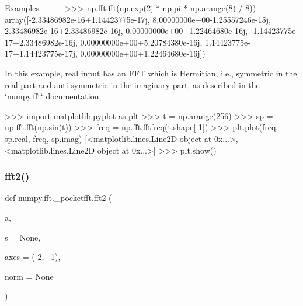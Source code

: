 \begin{DoxyVerb}
Examples
--------
>>> np.fft.fft(np.exp(2j * np.pi * np.arange(8) / 8))
array([-2.33486982e-16+1.14423775e-17j,  8.00000000e+00-1.25557246e-15j,
        2.33486982e-16+2.33486982e-16j,  0.00000000e+00+1.22464680e-16j,
       -1.14423775e-17+2.33486982e-16j,  0.00000000e+00+5.20784380e-16j,
        1.14423775e-17+1.14423775e-17j,  0.00000000e+00+1.22464680e-16j])

In this example, real input has an FFT which is Hermitian, i.e., symmetric
in the real part and anti-symmetric in the imaginary part, as described in
the `numpy.fft` documentation:

>>> import matplotlib.pyplot as plt
>>> t = np.arange(256)
>>> sp = np.fft.fft(np.sin(t))
>>> freq = np.fft.fftfreq(t.shape[-1])
>>> plt.plot(freq, sp.real, freq, sp.imag)
[<matplotlib.lines.Line2D object at 0x...>, <matplotlib.lines.Line2D object at 0x...>]
>>> plt.show()\end{DoxyVerb}
 \mbox{\label{namespacenumpy_1_1fft_1_1__pocketfft_ad62d1159321b978a20ec8303704101cc}} 
\subsubsection{\texorpdfstring{fft2()}{fft2()}}
{\footnotesize\ttfamily def numpy.\+fft.\+\_\+pocketfft.\+fft2 (\begin{DoxyParamCaption}\item[{}]{a,  }\item[{}]{s = {\ttfamily None},  }\item[{}]{axes = {\ttfamily (-\/2,~-\/1)},  }\item[{}]{norm = {\ttfamily None} }\end{DoxyParamCaption})}


